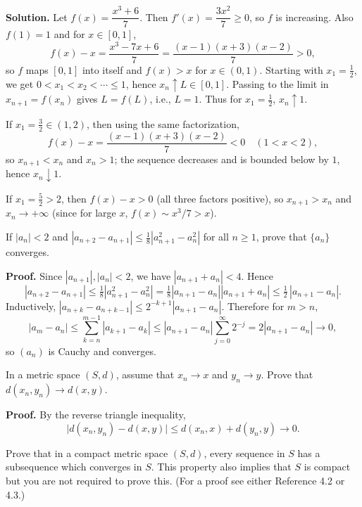 \noindent\textbf{Solution.}
Let $f(x)=\dfrac{x^3+6}{7}$. Then $f'(x)=\dfrac{3x^2}{7}\ge 0$, so $f$ is increasing. Also $f(1)=1$ and for $x\in[0,1]$,
\[
f(x)-x=\frac{x^3-7x+6}{7}=\frac{(x-1)(x+3)(x-2)}{7}>0,
\]
so $f$ maps $[0,1]$ into itself and $f(x)>x$ for $x\in(0,1)$. Starting with $x_1=\tfrac12$, we get $0<x_1<x_2<\cdots\le 1$, hence $x_n\uparrow L\in[0,1]$. Passing to the limit in $x_{n+1}=f(x_n)$ gives $L=f(L)$, i.e., $L=\textbf{$1$}$. Thus for $x_1=\tfrac12$, $x_n\uparrow \textbf{$1$}$.

If $x_1=\tfrac32\in(1,2)$, then using the same factorization,
\[
f(x)-x=\frac{(x-1)(x+3)(x-2)}{7}<0\quad(1<x<2),
\]
so $x_{n+1}<x_n$ and $x_n>1$; the sequence decreases and is bounded below by $1$, hence $x_n\downarrow \textbf{$1$}$.

If $x_1=\tfrac52>2$, then $f(x)-x>0$ (all three factors positive), so $x_{n+1}>x_n$ and $x_n\to+\infty$ (since for large $x$, $f(x)\sim x^3/7>x$).
\medskip

\begin{problembox}
If $|a_n| < 2$ and $|a_{n+2} - a_{n+1}| \leq \frac{1}{8} |a_{n+1}^2 - a_n^2|$ for all $n \geq 1$, prove that $\{a_n\}$ converges.
\end{problembox}

\noindent\textbf{Proof.}
Since $|a_{n+1}|,|a_n|<2$, we have $|a_{n+1}+a_n|<4$. Hence
\[
|a_{n+2}-a_{n+1}|\le\tfrac18|a_{n+1}^2-a_n^2|=\tfrac18|a_{n+1}-a_n||a_{n+1}+a_n|
\le \tfrac12\,|a_{n+1}-a_n|.
\]
Inductively, $|a_{n+k}-a_{n+k-1}|\le 2^{-k+1}|a_{n+1}-a_n|$. Therefore for $m>n$,
\[
|a_m-a_n|\le \sum_{k=n}^{m-1}|a_{k+1}-a_k|\le |a_{n+1}-a_n|\sum_{j=0}^{\infty}2^{-j}=2|a_{n+1}-a_n|\to 0,
\]
so $(a_n)$ is Cauchy and converges.
\medskip

\begin{problembox}
In a metric space $(S, d)$, assume that $x_n \to x$ and $y_n \to y$. Prove that $d(x_n, y_n) \to d(x, y)$.
\end{problembox}

\noindent\textbf{Proof.}
By the reverse triangle inequality,
\[
\big|d(x_n,y_n)-d(x,y)\big|\le d(x_n,x)+d(y_n,y)\to 0.
\]
\medskip

\begin{problembox}
Prove that in a compact metric space $(S, d)$, every sequence in $S$ has a subsequence which converges in $S$. This property also implies that $S$ is compact but you are not required to prove this. (For a proof see either Reference 4.2 or 4.3.)
\end{problembox}


